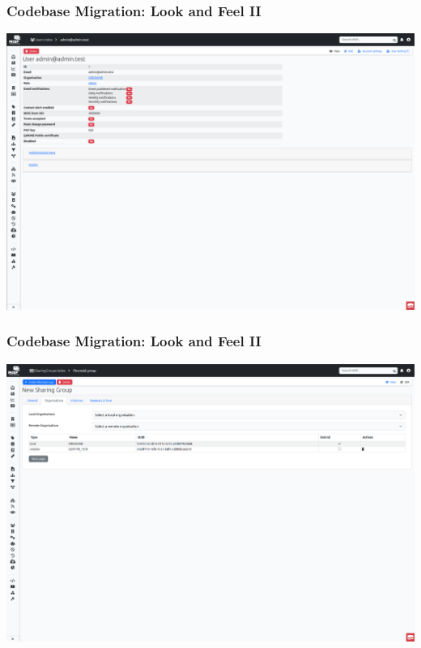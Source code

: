 \begin{frame}
    \frametitle{Codebase Migration: Look and Feel II}
    \begin{center}
        \includegraphics[width=1.0\linewidth]{pictures/user-view.png}
    \end{center}
\end{frame}

\begin{frame}
    \frametitle{Codebase Migration: Look and Feel II}
    \begin{center}
        \includegraphics[width=1.0\linewidth]{pictures/sharinggroup-add.png}
    \end{center}
\end{frame}


